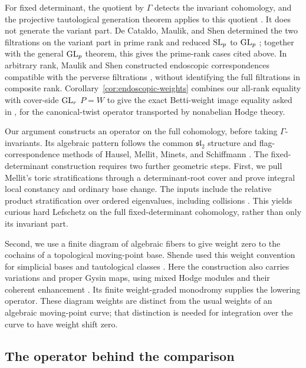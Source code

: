 For fixed determinant, the quotient by $\Gamma$ detects the invariant cohomology, and the projective tautological generation theorem applies to this quotient \cite[Theorem~2.1(i)]{MS2024}. It does not generate the variant part. De Cataldo, Maulik, and Shen determined the two filtrations on the variant part in prime rank and reduced $\operatorname{SL}_p$ to $\operatorname{GL}_p$ \cite{dCMS2022}; together with the general $\operatorname{GL}_p$ theorem, this gives the prime-rank cases cited above. In arbitrary rank, Maulik and Shen constructed endoscopic correspondences compatible with the perverse filtrations \cite[Theorem~5.4]{MSEndoscopy2021}, without identifying the full filtrations in composite rank. Corollary~\ref{cor:endoscopic-weights} combines our all-rank equality with cover-side $\operatorname{GL}_r$ $P=W$ to give the exact Betti-weight image equality asked in \cite[Question~5.5]{MSEndoscopy2021}, for the canonical-twist operator transported by nonabelian Hodge theory.

Our argument constructs an operator on the full cohomology, before taking $\Gamma$-invariants. Its algebraic pattern follows the common $\mathfrak{sl}_2$ structure and flag-correspondence methods of Hausel, Mellit, Minets, and Schiffmann \cite[Proposition~7.9 and Section~8]{HMMS2025}. The fixed-determinant construction requires two further geometric steps. First, we pull Mellit's toric stratifications through a determinant-root cover and prove integral local constancy and ordinary base change. The inputs include the relative product stratification over ordered eigenvalues, including collisions \cite[Section~7.4, Theorem~7.5, and proof of Proposition~8.7]{Mellit2025}. This yields curious hard Lefschetz on the full fixed-determinant cohomology, rather than only its invariant part.

Second, we use a finite diagram of algebraic fibers to give weight zero to the cochains of a topological moving-point base. Shende used this weight convention for simplicial bases and tautological classes \cite[proof of the main Theorem]{Shende2017}. Here the construction also carries variations and proper Gysin maps, using mixed Hodge modules and their coherent enhancement \cite{SaitoExtension1990,TubachStacks2025}. Its finite weight-graded monodromy supplies the lowering operator. These diagram weights are distinct from the usual weights of an algebraic moving-point curve; that distinction is needed for integration over the curve to have weight shift zero.

\subsection{The operator behind the comparison}

